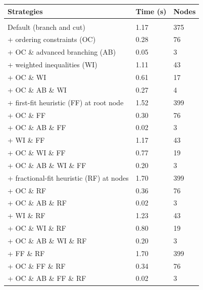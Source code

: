 \begin{table}[htp]
\begin{minipage}[l]{\textwidth}
\begin{small}
\begin{tabular}{|lll|}
\hline
\textbf{Strategies} & \textbf{Time (s)}   & \textbf{Nodes} \\ \hline & &\\[-10pt]
Default (branch and cut)                           & 1.17 & 375 \\
+ ordering constraints (OC)                        & 0.28 & 76 \\
+ OC \& advanced branching (AB)                    & 0.05 & 3 \\
+ weighted inequalities (WI)                       & 1.11 & 43 \\
+ OC \& WI                                         & 0.61 & 17 \\
+ OC \& AB \& WI                                   & 0.27 & 4 \\
+ first-fit heuristic (FF) at root node            & 1.52 & 399 \\
+ OC \& FF                                         & 0.30 & 76 \\
+ OC \& AB \& FF                                   & 0.02 & 3 \\
+ WI \& FF                                         & 1.17 & 43 \\
+ OC \& WI \& FF                                   & 0.77 & 19 \\
+ OC \& AB \& WI \& FF                             & 0.20 & 3 \\
+ fractional-fit heuristic (RF) at nodes           & 1.70 & 399 \\
+ OC \& RF                                         & 0.36 & 76 \\
+ OC \& AB \& RF                                   & 0.02 & 3 \\
+ WI \& RF                                         & 1.23 & 43 \\
+ OC \& WI \& RF                                   & 0.80 & 19 \\
+ OC \& AB \& WI \& RF                             & 0.20 & 3 \\
+ FF \& RF                                         & 1.70 & 399 \\
+ OC \& FF \& RF                                   & 0.34 & 76 \\
+ OC \& AB \& FF \& RF                             & 0.02 & 3 \\

\end{tabular}
\end{small}
\end{minipage}
\end{table}
